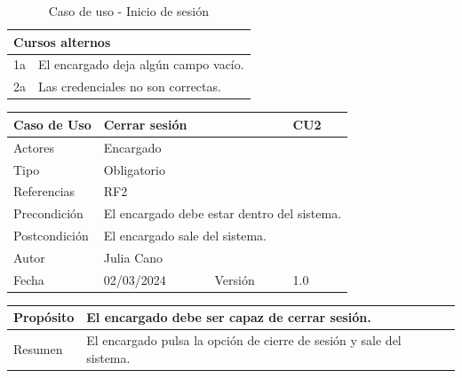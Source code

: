 \begin{table}[H]
	\centering
	\begin{tabular}{| m{} | m{} | m{} | m{} |}
		\hline
		\multicolumn{4}{|m{0.9\textwidth}|}{Cursos alternos}     \\ 
		\hline
		1a & \multicolumn{3}{l|}{El encargado deja algún campo vacío.} \\ 
		\hline
		2a & \multicolumn{3}{l|}{Las credenciales no son correctas.} \\ 
		\hline
	\end{tabular}
	\caption{Caso de uso - Inicio de sesión}
\end{table}

\newpage


\begin{table}[H]
	\centering
	\begin{tabular}{| m{} | m{} | m{} | m{} |}
		\hline
		\rowcolor{grayshade} Caso de Uso & \multicolumn{2}{|m{0.43\textwidth}|}{Cerrar sesión} &  CU2\\ 
		\hline
		Actores & \multicolumn{3}{l|}{Encargado} \\ 
		\hline
		Tipo & \multicolumn{3}{l|}{Obligatorio} \\ 
		\hline
		Referencias & \multicolumn{3}{l|}{RF2} \\ 
		\hline
		Precondición & \multicolumn{3}{l|}{El encargado debe estar dentro del sistema.} \\ 
		\hline
		Postcondición & \multicolumn{3}{l|}{El encargado sale del sistema.} \\ 
		\hline
		Autor & \multicolumn{3}{l|}{Julia Cano} \\ 
		\hline
		Fecha & 02/03/2024 & Versión & 1.0 \\
		\hline
	\end{tabular}
\end{table}

\begin{table}[H]
	\centering
	\begin{tabular}{| m{} | m{} | m{} | m{} |}
		\hline
		Propósito & \multicolumn{3}{m{0.67\textwidth}|}{El encargado debe ser capaz de cerrar sesión.}   \\ 
		\hline
		Resumen & \multicolumn{3}{m{0.67\textwidth}|}{El encargado pulsa la opción de cierre de sesión y sale del sistema.} \\ 
		\hline
	\end{tabular}
\end{table}


